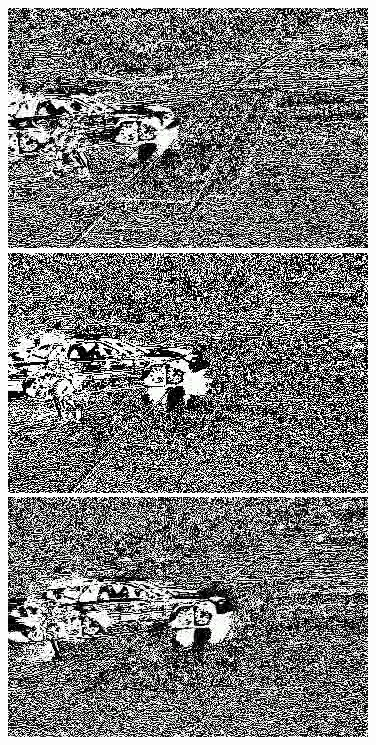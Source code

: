 \documentclass[a4paper]{ctexart}
\begin{document}
\begin{figure}[htbp]
\begin{minipage}[t]{0.2\textwidth}
	\end{minipage}
	\begin{minipage}[t]{0.2\textwidth}
		\centering
		\includegraphics[width=\textwidth]{figure/frames/sb3405.jpg}
	\end{minipage}
	\begin{minipage}[t]{0.2\textwidth}
		\centering
		\includegraphics[width=\textwidth]{figure/frames/sb3410.jpg}
	\end{minipage}
	\begin{minipage}[t]{0.2\textwidth}
		\centering
		\includegraphics[width=\textwidth]{figure/frames/sb3415.jpg}

\end{minipage}
\end{figure}
\end{document}
